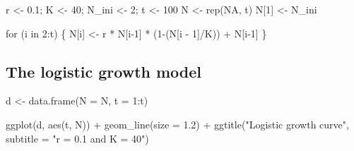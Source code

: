 \documentclass[
  letterpaper,
  DIV=11,
  numbers=noendperiod]{scrartcl}
\newenvironment{Shaded}{\begin{snugshade}}{\end{snugshade}}
\newcommand{\AttributeTok}[1]{\textcolor[rgb]{0.40,0.45,0.13}{#1}}
\newcommand{\ConstantTok}[1]{\textcolor[rgb]{0.56,0.35,0.01}{#1}}
\newcommand{\ControlFlowTok}[1]{\textcolor[rgb]{0.00,0.23,0.31}{#1}}
\newcommand{\DecValTok}[1]{\textcolor[rgb]{0.68,0.00,0.00}{#1}}
\newcommand{\FloatTok}[1]{\textcolor[rgb]{0.68,0.00,0.00}{#1}}
\newcommand{\FunctionTok}[1]{\textcolor[rgb]{0.28,0.35,0.67}{#1}}
\newcommand{\NormalTok}[1]{\textcolor[rgb]{0.00,0.23,0.31}{#1}}
\newcommand{\OtherTok}[1]{\textcolor[rgb]{0.00,0.23,0.31}{#1}}
\newcommand{\SpecialCharTok}[1]{\textcolor[rgb]{0.37,0.37,0.37}{#1}}
\newcommand{\StringTok}[1]{\textcolor[rgb]{0.13,0.47,0.30}{#1}}
\begin{document}
\begin{Shaded}
\begin{Highlighting}[]
\NormalTok{r }\OtherTok{\textless{}{-}} \FloatTok{0.1}\NormalTok{; K }\OtherTok{\textless{}{-}} \DecValTok{40}\NormalTok{; N\_ini }\OtherTok{\textless{}{-}} \DecValTok{2}\NormalTok{; t }\OtherTok{\textless{}{-}} \DecValTok{100}
\NormalTok{N }\OtherTok{\textless{}{-}} \FunctionTok{rep}\NormalTok{(}\ConstantTok{NA}\NormalTok{, t)}
\NormalTok{N[}\DecValTok{1}\NormalTok{] }\OtherTok{\textless{}{-}}\NormalTok{ N\_ini}

\ControlFlowTok{for}\NormalTok{ (i }\ControlFlowTok{in} \DecValTok{2}\SpecialCharTok{:}\NormalTok{t) \{}
\NormalTok{N[i] }\OtherTok{\textless{}{-}}\NormalTok{ r }\SpecialCharTok{*}\NormalTok{ N[i}\DecValTok{{-}1}\NormalTok{] }\SpecialCharTok{*}\NormalTok{ (}\DecValTok{1}\SpecialCharTok{{-}}\NormalTok{(N[i }\SpecialCharTok{{-}} \DecValTok{1}\NormalTok{]}\SpecialCharTok{/}\NormalTok{K)) }\SpecialCharTok{+}\NormalTok{ N[i}\DecValTok{{-}1}\NormalTok{]}
\NormalTok{\}}
\end{Highlighting}
\end{Shaded}

\hypertarget{the-logistic-growth-model-7}{%
\subsection{The logistic growth
model}\label{the-logistic-growth-model-7}}

\begin{Shaded}
\begin{Highlighting}[]
\NormalTok{d }\OtherTok{\textless{}{-}} \FunctionTok{data.frame}\NormalTok{(}\AttributeTok{N =}\NormalTok{ N, }\AttributeTok{t =} \DecValTok{1}\SpecialCharTok{:}\NormalTok{t)}

\FunctionTok{ggplot}\NormalTok{(d, }\FunctionTok{aes}\NormalTok{(t, N)) }\SpecialCharTok{+}
  \FunctionTok{geom\_line}\NormalTok{(}\AttributeTok{size =} \FloatTok{1.2}\NormalTok{) }\SpecialCharTok{+} 
  \FunctionTok{ggtitle}\NormalTok{(}\StringTok{"Logistic growth curve"}\NormalTok{, }\AttributeTok{subtitle =} \StringTok{"r = 0.1 and K = 40"}\NormalTok{)}
\end{Highlighting}
\end{Shaded}
\end{document}
